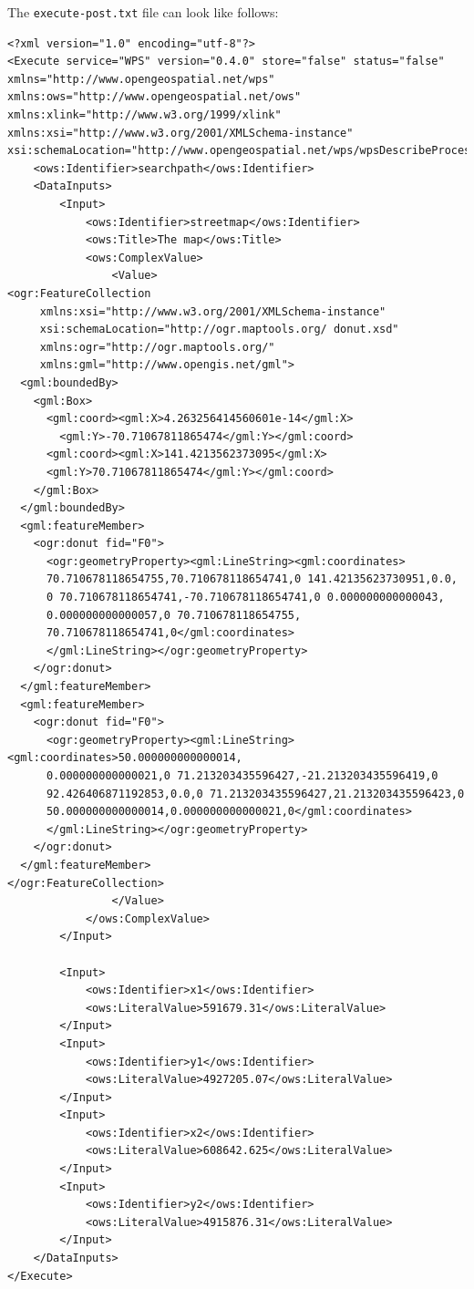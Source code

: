 \documentclass[a4paper,11pt]{article}
\begin{document}
The \texttt{execute-post.txt} file can look like follows:
\begin{verbatim}
<?xml version="1.0" encoding="utf-8"?>
<Execute service="WPS" version="0.4.0" store="false" status="false"
xmlns="http://www.opengeospatial.net/wps"
xmlns:ows="http://www.opengeospatial.net/ows"
xmlns:xlink="http://www.w3.org/1999/xlink"
xmlns:xsi="http://www.w3.org/2001/XMLSchema-instance"
xsi:schemaLocation="http://www.opengeospatial.net/wps/wpsDescribeProcess.xsd">
    <ows:Identifier>searchpath</ows:Identifier>
    <DataInputs>
        <Input>
            <ows:Identifier>streetmap</ows:Identifier>
            <ows:Title>The map</ows:Title>
            <ows:ComplexValue>
                <Value>
<ogr:FeatureCollection
     xmlns:xsi="http://www.w3.org/2001/XMLSchema-instance"
     xsi:schemaLocation="http://ogr.maptools.org/ donut.xsd"
     xmlns:ogr="http://ogr.maptools.org/"
     xmlns:gml="http://www.opengis.net/gml">
  <gml:boundedBy>
    <gml:Box>
      <gml:coord><gml:X>4.263256414560601e-14</gml:X>
        <gml:Y>-70.71067811865474</gml:Y></gml:coord>
      <gml:coord><gml:X>141.4213562373095</gml:X>
      <gml:Y>70.71067811865474</gml:Y></gml:coord>
    </gml:Box>
  </gml:boundedBy>                      
  <gml:featureMember>
    <ogr:donut fid="F0">
      <ogr:geometryProperty><gml:LineString><gml:coordinates>
      70.710678118654755,70.710678118654741,0 141.42135623730951,0.0,
      0 70.710678118654741,-70.710678118654741,0 0.000000000000043,
      0.000000000000057,0 70.710678118654755,
      70.710678118654741,0</gml:coordinates>
      </gml:LineString></ogr:geometryProperty>
    </ogr:donut>
  </gml:featureMember>
  <gml:featureMember>
    <ogr:donut fid="F0">
      <ogr:geometryProperty><gml:LineString><gml:coordinates>50.000000000000014,
      0.000000000000021,0 71.213203435596427,-21.213203435596419,0 
      92.426406871192853,0.0,0 71.213203435596427,21.213203435596423,0 
      50.000000000000014,0.000000000000021,0</gml:coordinates>
      </gml:LineString></ogr:geometryProperty>
    </ogr:donut>
  </gml:featureMember>
</ogr:FeatureCollection>
                </Value>
            </ows:ComplexValue>
        </Input>

        <Input>
            <ows:Identifier>x1</ows:Identifier>
            <ows:LiteralValue>591679.31</ows:LiteralValue>
        </Input>
        <Input>
            <ows:Identifier>y1</ows:Identifier>
            <ows:LiteralValue>4927205.07</ows:LiteralValue>
        </Input>
        <Input>
            <ows:Identifier>x2</ows:Identifier>
            <ows:LiteralValue>608642.625</ows:LiteralValue>
        </Input>
        <Input>
            <ows:Identifier>y2</ows:Identifier>
            <ows:LiteralValue>4915876.31</ows:LiteralValue>
        </Input>
    </DataInputs>
</Execute>
    \end{verbatim}
     
\end{document}
